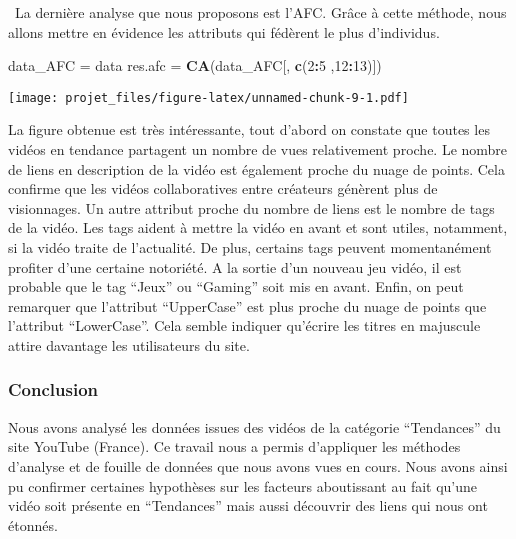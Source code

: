 \documentclass[
]{article}
\newenvironment{Shaded}{\begin{snugshade}}{\end{snugshade}}
\newcommand{\DecValTok}[1]{\textcolor[rgb]{0.00,0.00,0.81}{#1}}
\newcommand{\KeywordTok}[1]{\textcolor[rgb]{0.13,0.29,0.53}{\textbf{#1}}}
\newcommand{\NormalTok}[1]{#1}
\newcommand{\OperatorTok}[1]{\textcolor[rgb]{0.81,0.36,0.00}{\textbf{#1}}}
\newcommand{\StringTok}[1]{\textcolor[rgb]{0.31,0.60,0.02}{#1}}
\begin{document}
 La dernière analyse que nous proposons est l'AFC. Grâce à cette
méthode, nous allons mettre en évidence les attributs qui fédèrent le
plus d'individus.

\begin{Shaded}
\begin{Highlighting}[]
\NormalTok{data_AFC =}\StringTok{ }\NormalTok{data}
\NormalTok{res.afc =}\StringTok{ }\KeywordTok{CA}\NormalTok{(data_AFC[, }\KeywordTok{c}\NormalTok{(}\DecValTok{2}\OperatorTok{:}\DecValTok{5}\NormalTok{ ,}\DecValTok{12}\OperatorTok{:}\DecValTok{13}\NormalTok{)])}
\end{Highlighting}
\end{Shaded}

\texttt{[image: projet\_files/figure-latex/unnamed-chunk-9-1.pdf]}

La figure obtenue est très intéressante, tout d'abord on constate que
toutes les vidéos en tendance partagent un nombre de vues relativement
proche. Le nombre de liens en description de la vidéo est également
proche du nuage de points. Cela confirme que les vidéos collaboratives
entre créateurs génèrent plus de visionnages. Un autre attribut proche
du nombre de liens est le nombre de tags de la vidéo. Les tags aident à
mettre la vidéo en avant et sont utiles, notamment, si la vidéo traite
de l'actualité. De plus, certains tags peuvent momentanément profiter
d'une certaine notoriété. A la sortie d'un nouveau jeu vidéo, il est
probable que le tag ``Jeux'' ou ``Gaming'' soit mis en avant. Enfin, on
peut remarquer que l'attribut ``UpperCase'' est plus proche du nuage de
points que l'attribut ``LowerCase''. Cela semble indiquer qu'écrire les
titres en majuscule attire davantage les utilisateurs du site.

\hypertarget{conclusion}{%
\subsubsection{Conclusion}\label{conclusion}}

Nous avons analysé les données issues des vidéos de la catégorie
``Tendances'' du site YouTube (France). Ce travail nous a permis
d'appliquer les méthodes d'analyse et de fouille de données que nous
avons vues en cours. Nous avons ainsi pu confirmer certaines hypothèses
sur les facteurs aboutissant au fait qu'une vidéo soit présente en
``Tendances'' mais aussi découvrir des liens qui nous ont étonnés.
\end{document}
